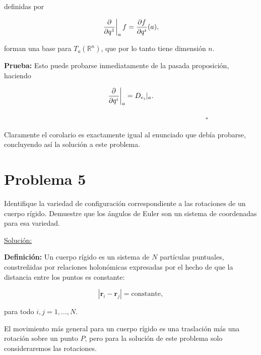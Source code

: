 \documentclass[a4paper,10pt]{article}
\numberwithin{equation}{section}
\newcommand{\zerodel}{.\kern-\nulldelimiterspace}
\newcommand{\definicion}{\textbf{Definición: }}
\newcommand{\prueba}{\textbf{Prueba: }}
\begin{document}
definidas por 

\begin{equation}
  \left\zerodel\frac{\partial}{\partial q^1}\right|_a f = 
  \frac{\partial f}{\partial q^i}(a),
\end{equation}

forman una base para $T_a(\mathbb{R}^n)$, que por lo tanto tiene 
dimensión $n$.

\vspace{.3cm}

\prueba Esto puede probarse inmediatamente de la pasada proposición, 
haciendo 

\begin{equation}
 \left\zerodel\frac{\partial}{\partial q^i}\right|_a = D_{e_{i}}|_a. 
\end{equation}

$\hspace{12cm} \square$

Claramente el corolario es exactamente igual al enunciado que debía 
probarse, concluyendo así la solución a este problema.

\section{Problema 5}

Identifique la variedad de configuración correspondiente a las rotaciones de un cuerpo 
rígido. Demuestre que los ángulos de Euler son un sistema de coordenadas para esa 
variedad.

\vspace{.3cm}

\underline{Solución:} \vspace{.3cm}

\definicion Un cuerpo rígido es un sistema de $N$ partículas puntuales, constreñidas 
por relaciones holonómicas expresadas por el hecho de que la distancia entre los 
puntos es constante:

\begin{equation}
 |\mathbf{r}_i - \mathbf{r}_j| = \text{constante},
\end{equation}

para todo $i,j = 1,\dots,N$.

\vspace{.3cm}

El movimiento más general para un cuerpo rígido es una traslación más una rotación 
sobre un punto $P$, pero para la solución de este problema solo consideraremos las 
rotaciones.
\end{document}
